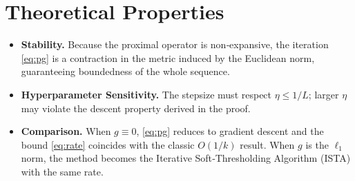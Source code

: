 \documentclass{article}
\begin{document}
\section*{Theoretical Properties}
\begin{itemize}
\item \textbf{Stability.} Because the proximal operator is non‑expansive, the iteration \eqref{eq:pg} is a contraction in the metric induced by the Euclidean norm, guaranteeing boundedness of the whole sequence.
\item \textbf{Hyperparameter Sensitivity.} The stepsize must respect $\eta\le1/L$; larger $\eta$ may violate the descent property derived in the proof.
\item \textbf{Comparison.} When $g\equiv0$, \eqref{eq:pg} reduces to gradient descent and the bound \eqref{eq:rate} coincides with the classic $O(1/k)$ result. When $g$ is the $\ell_{1}$ norm, the method becomes the Iterative Soft‑Thresholding Algorithm (ISTA) with the same rate.
\end{itemize}
\end{document}
